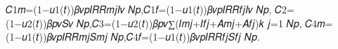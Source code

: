 𝐶1𝑚=(1−𝑢1(𝑡))𝛽𝑣𝑝𝐼𝑅𝑅𝑚𝑗𝐼𝑣
𝑁𝑝,𝐶1𝑓=(1−𝑢1(𝑡))𝛽𝑣𝑝𝐼𝑅𝑅𝑓𝑗𝐼𝑣
𝑁𝑝,
𝐶2=(1−𝑢2(𝑡))𝛽𝑝𝑣𝑆𝑣
𝑁𝑝,𝐶3=(1−𝑢2(𝑡))𝛽𝑝𝑣∑(𝐼𝑚𝑗+𝐼𝑓𝑗+𝐴𝑚𝑗+𝐴𝑓𝑗)𝑘
𝑗=1
𝑁𝑝,
𝐶4𝑚=(1−𝑢1(𝑡))𝛽𝑣𝑝𝐼𝑅𝑅𝑚𝑗𝑆𝑚𝑗
𝑁𝑝,𝐶4𝑓=(1−𝑢1(𝑡))𝛽𝑣𝑝𝐼𝑅𝑅𝑓𝑗𝑆𝑓𝑗
𝑁𝑝.